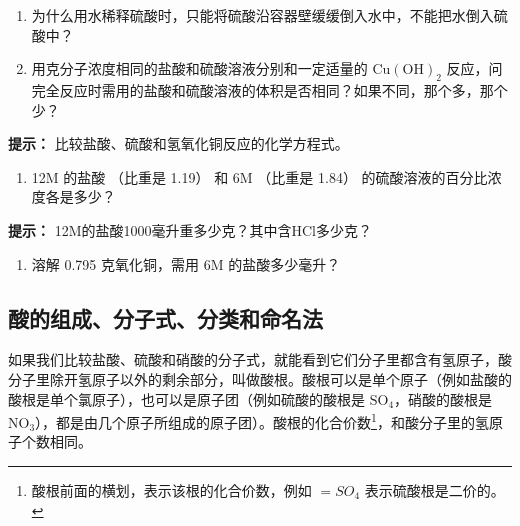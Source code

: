 {\centering
\small\setlength{\tabcolsep}{3pt}%
\par
}

\begin{enumerate}[start=5]
\item
  为什么用水稀释硫酸时，只能将硫酸沿容器壁缓缓倒入水中，不能把水倒入硫酸中？
\item
  用克分子浓度相同的盐酸和硫酸溶液分别和一定适量的 \(\mathrm{Cu(OH)}_2\)
  反应，问完全反应时需用的盐酸和硫酸溶液的体积是否相同？如果不同，那个多，那个少？
\end{enumerate}

\begin{shulihuadef}
\textbf{提示：} 比较盐酸、硫酸和氢氧化铜反应的化学方程式。
\end{shulihuadef}

\begin{enumerate}[start=7]
\item
  12M 的盐酸 （比重是 1.19） 和 6M （比重是 1.84）
  的硫酸溶液的百分比浓度各是多少？
\end{enumerate}

\begin{shulihuadef}
\textbf{提示：} 12M的盐酸1000毫升重多少克？其中含HCl多少克？
\end{shulihuadef}

\begin{enumerate}[start=8]
\item
  溶解 0.795 克氧化铜，需用 6M 的盐酸多少毫升？
\end{enumerate}

\subsection{酸的组成、分子式、分类和命名法}

如果我们比较盐酸、硫酸和硝酸的分子式，就能看到它们分子里都含有氢原子，酸分子里除开氢原子以外的剩余部分，叫做酸根。酸根可以是单个原子（例如盐酸的酸根是单个氯原子），也可以是原子团（例如硫酸的酸根是
\(\mathrm{SO}_4\)，硝酸的酸根是
\(\mathrm{NO}_{3}\)），都是由几个原子所组成的原子团）。酸根的化合价数\footnote{酸根前面的横划，表示该根的化合价数，例如
  \(=SO_{4}\) 表示硫酸根是二价的。}，和酸分子里的氢原子个数相同。

